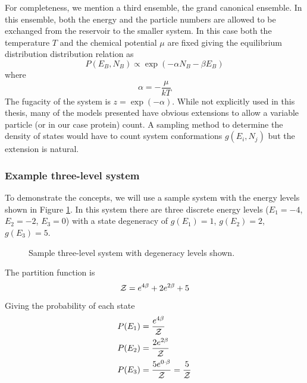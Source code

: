 For completeness, we mention a third ensemble, the grand canonical ensemble. In this ensemble, both the energy and the particle numbers are allowed to be exchanged from the reservoir to the smaller system. In this case both the temperature $T$ and the chemical potential $\mu$ are fixed giving the equilibrium distribution distribution relation as
\begin{equation}
  P(E_B, N_B) \propto \exp ( -\alpha N_B - \beta E_B)
\end{equation}
where
\begin{equation}
  \alpha = - \frac{\mu}{kT}
\end{equation}
The fugacity of the system is $z = \exp(-\alpha)$. While not explicitly used in this thesis, many of the models presented have obvious extensions to allow a variable particle (or in our case protein) count. A sampling method to determine the density of states would have to count system conformations $g(E_i, N_j)$ but the extension is natural.

\subsubsection{Example three-level system}

To demonstrate the concepts, we will use a sample system with the energy levels shown in Figure \ref{fig:sample_energy_level}. In this system there are three discrete energy levels ($E_1=-4$, $E_2=-2$, $E_3=0$) with a state degeneracy of $g(E_1) = 1$, $g(E_2) = 2$, $g(E_3)=5$.
%
\begin{figure}
  \TIKZenergylevel
  \caption{Sample three-level system with degeneracy levels shown.}
  \label{fig:sample_energy_level}
\end{figure}
%
The partition function is
\begin{equation}
  \mathcal{Z} = e^{4\beta} + 2 e^{2\beta} + 5 
\end{equation}
%
Giving the probability of each state
\begin{align}
  P(E_1) &= \frac{e^{4\beta}}{\mathcal{Z}}  \\
  P(E_2) &= \frac{2 e^{2\beta}}{\mathcal{Z}}  \nonumber \\
  P(E_3) &= \frac{5  e^{0 \cdot \beta} }{\mathcal{Z}} = \frac{5}{\mathcal{Z}} \nonumber
\end{align}

